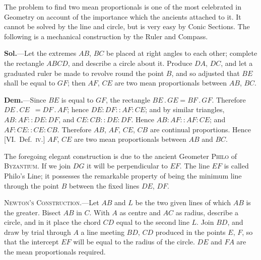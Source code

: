 \documentclass[oneside]{book}
\newcommand{\ibksp}{\hspace{-1.5em}}
\newcommand\imgcent[2]{
\begin{center}
\end{center}
}
\begin{document}
\begin{footnotesize}
The problem to find two mean proportionals is one of the most
celebrated in Geometry on account of the importance which the
ancients attached to it. It cannot be solved by the line and
circle, but is very easy by Conic Sections. The following is a
mechanical construction by the Ruler and Compass.

\textbf{Sol.}---Let the extremes $AB$, $BC$ be placed at right angles to
each other; complete the rectangle $ABCD$, and describe a circle
about it. Produce $DA$, $DC$, and let a graduated ruler be made
to revolve round the point $B$, and so adjusted that $BE$ shall be
equal to $GF$; then $AF$, $CE$ are two mean proportionals between
$AB$, $BC$.

\imgcent{178}{f251}

\textbf{Dem.}---Since $BE$ is equal to $GF$, the rectangle $BE\,.\,GE
= BF\,.\,GF$. Therefore $DE\,.\,CE$\ $= DF\,.\,AF$; hence $DE : DF
:: AF : CE$; and by similar triangles, $AB : AF :: DE : DF$, and
$CE : CB :: DE : DF$. Hence $AB : AF :: AF : CE$; and $AF : CE
:: CE : CB$. Therefore $AB$, $AF$, $CE$, $CB$ are continual proportions.
Hence [VI\@.\ Def.~\textsc{iv.}] $AF$, $CE$ are two mean proportionals
between $AB$ and $BC$.

The foregoing elegant construction is due to the ancient
Geometer \textsc{Philo} of \textsc{Byzantium}. If we join $DG$ it will be
perpendicular to $EF$. The line $EF$ is called Philo's Line; it
possesses the remarkable property of being the minimum line
through the point $B$ between the fixed lines $DE$, $DF$.

\addcontentsline{toc}{section}{\ibksp\;,,\protect\phantom{.---}Newton's solution,}
\textsc{Newton's Construction.}---Let $AB$ and $L$ be the two given
lines of which $AB$ is the greater. Bisect $AB$ in $C$. With $A$ as
centre and $AC$ as radius, describe a circle, and in it place the
chord $CD$ equal to the second line $L$. Join $BD$, and draw by
trial through $A$ a line meeting $BD$, $CD$ produced in the points
$E$, $F$, so that the intercept $EF$ will be equal to the radius of the
circle. $DE$ and $FA$ are the mean proportionals required.

\imgcent{190}{f252}


\end{footnotesize}
\end{document}
